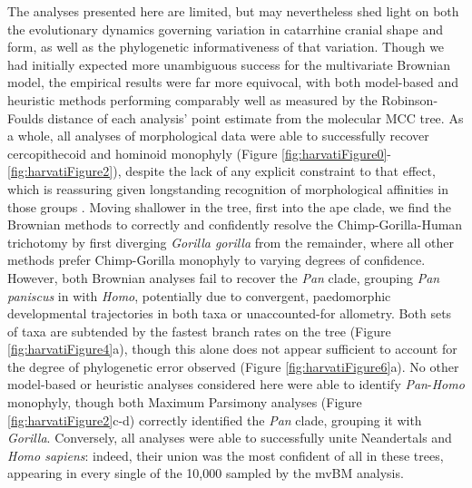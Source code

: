 \documentclass[10pt, twocolumn, twoside]{article}
\begin{document}
The analyses presented here are limited, but may nevertheless shed light on both the evolutionary dynamics governing variation in catarrhine cranial shape and form, as well as the phylogenetic informativeness of that variation. Though we had initially expected more unambiguous success for the multivariate Brownian model, the empirical results were far more equivocal, with both model-based and heuristic methods performing comparably well as measured by the Robinson-Foulds distance of each analysis' point estimate from the molecular MCC tree. As a whole, all analyses of morphological data were able to successfully recover cercopithecoid and hominoid monophyly (Figure \ref{fig:harvatiFigure0}-\ref{fig:harvatiFigure2}), despite the lack of any explicit constraint to that effect, which is reassuring given longstanding recognition of morphological affinities in those groups \citep{darwinDescentManSelection1896}. Moving shallower in the tree, first into the ape clade, we find the Brownian methods to correctly and confidently resolve the Chimp-Gorilla-Human trichotomy \citep{bradleyReconstructingPhylogeniesPhenotypes2008} by first diverging \textit{Gorilla gorilla} from the remainder, where all other methods prefer Chimp-Gorilla monophyly to varying degrees of confidence. However, both Brownian analyses fail to recover the \textit{Pan} clade, grouping \textit{Pan paniscus} in with \textit{Homo}, potentially due to convergent, paedomorphic developmental trajectories in both taxa \citep{sheaPaedomorphosisNeotenyPygmy1983, williamsDiagnosingHeterochronicPerturbations2001} or unaccounted-for allometry. Both sets of taxa are subtended by the fastest branch rates on the tree (Figure \ref{fig:harvatiFigure4}a), though this alone does not appear sufficient to account for the degree of phylogenetic error observed (Figure \ref{fig:harvatiFigure6}a). No other model-based or heuristic analyses considered here were able to identify \textit{Pan}-\textit{Homo} monophyly, though both Maximum Parsimony analyses (Figure \ref{fig:harvatiFigure2}c-d) correctly identified the \textit{Pan} clade, grouping it with \textit{Gorilla}. Conversely, all analyses were able to successfully unite Neandertals and \textit{Homo sapiens}: indeed, their union was the most confident of all in these trees, appearing in every single of the 10,000 sampled by the mvBM analysis.
\end{document}
